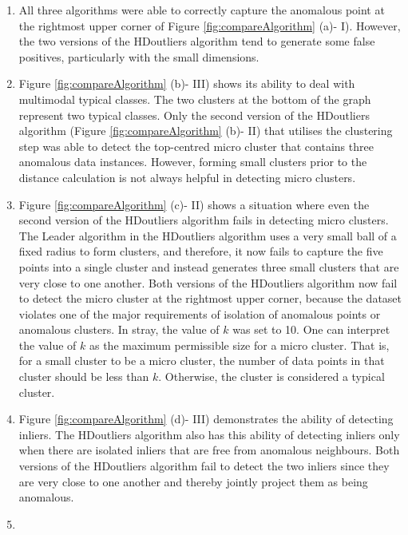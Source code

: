 \documentclass[11pt,a4paper,]{article}
\theoremstyle{definition}
\theoremstyle{definition}
\theoremstyle{definition}
\theoremstyle{remark}
\begin{document}
\begin{enumerate}
\def\labelenumi{(\arabic{enumi})}
\item
  All three algorithms were able to correctly capture the anomalous point at the rightmost upper corner of Figure \ref{fig:compareAlgorithm} (a)- I). However, the two versions of the HDoutliers algorithm tend to generate some false positives, particularly with the small dimensions.
\item
  Figure \ref{fig:compareAlgorithm} (b)- III) shows its ability to deal with multimodal typical classes. The two clusters at the bottom of the graph represent two typical classes. Only the second version of the HDoutliers algorithm (Figure \ref{fig:compareAlgorithm} (b)- II) that utilises the clustering step was able to detect the top-centred micro cluster that contains three anomalous data instances. However, forming small clusters prior to the distance calculation is not always helpful in detecting micro clusters.
\item
  Figure \ref{fig:compareAlgorithm} (c)- II) shows a situation where even the second version of the HDoutliers algorithm fails in detecting micro clusters. The Leader algorithm in the HDoutliers algorithm uses a very small ball of a fixed radius to form clusters, and therefore, it now fails to capture the five points into a single cluster and instead generates three small clusters that are very close to one another. Both versions of the HDoutliers algorithm now fail to detect the micro cluster at the rightmost upper corner, because the dataset violates one of the major requirements of isolation of anomalous points or anomalous clusters. In stray, the value of \(k\) was set to 10. One can interpret the value of \(k\) as the maximum permissible size for a micro cluster. That is, for a small cluster to be a micro cluster, the number of data points in that cluster should be less than \(k\). Otherwise, the cluster is considered a typical cluster.
\item
  Figure \ref{fig:compareAlgorithm} (d)- III) demonstrates the ability of detecting inliers. The HDoutliers algorithm also has this ability of detecting inliers only when there are isolated inliers that are free from anomalous neighbours. Both versions of the HDoutliers algorithm fail to detect the two inliers since they are very close to one another and thereby jointly project them as being anomalous.
\item

\end{enumerate}
\end{document}
